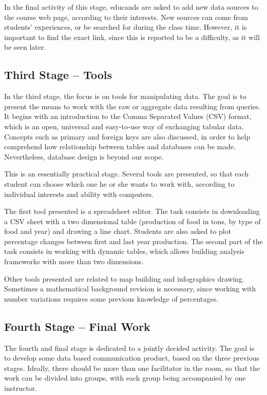 In the final activity of this stage, educands are asked to add new data sources to the course web page, according to their interests. New sources can come from students' experiences, or be searched for during the class time. However, it is important to find the exact link, since this is reported to be a difficulty, as it will be seen later.

\subsection{Third Stage – Tools}

In the third stage, the focus is on tools for manipulating data. The goal is to present the means to work with the raw or aggregate data resulting from queries. It begins with an introduction to the Comma Separated Values (CSV) format, which is an open, universal and easy-to-use way of exchanging tabular data. Concepts such as primary and foreign keys are also discussed, in order to help comprehend how relationship between tables and databases can be made. Nevertheless, database design is beyond our scope.

This is an essentially practical stage. Several tools are presented, so that each student can choose which one he or she wants to work with, according to individual interests and ability with computers.

The first tool presented is a spreadsheet editor. The task consists in downloading a CSV sheet with a two dimensional table (production of food in tons, by type of food and year) and drawing a line chart. Students are also asked to plot percentage changes between first and last year production. The second part of the task consists in working with dynamic tables, which allows building analysis frameworks with more than two dimensions.

Other tools presented are related to map building and infographics drawing. Sometimes a mathematical background revision is necessary, since working with number variations requires some previous knowledge of percentages.

\subsection{Fourth Stage – Final Work}

The fourth and final stage is dedicated to a jointly decided activity. The goal is to develop some data based communication product, based on the three previous stages. Ideally, there should be more than one facilitator in the room, so that the work can be divided into groups, with each group being accompanied by one instructor.


